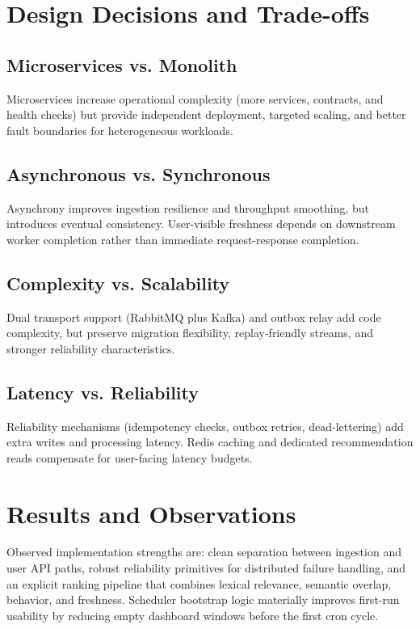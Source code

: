 \documentclass[conference]{IEEEtran}
\begin{document}
\section{Design Decisions and Trade-offs}
\subsection{Microservices vs. Monolith}
Microservices increase operational complexity (more services, contracts, and health checks) but provide independent deployment, targeted scaling, and better fault boundaries for heterogeneous workloads.

\subsection{Asynchronous vs. Synchronous}
Asynchrony improves ingestion resilience and throughput smoothing, but introduces eventual consistency. User-visible freshness depends on downstream worker completion rather than immediate request-response completion.

\subsection{Complexity vs. Scalability}
Dual transport support (RabbitMQ plus Kafka) and outbox relay add code complexity, but preserve migration flexibility, replay-friendly streams, and stronger reliability characteristics.

\subsection{Latency vs. Reliability}
Reliability mechanisms (idempotency checks, outbox retries, dead-lettering) add extra writes and processing latency. Redis caching and dedicated recommendation reads compensate for user-facing latency budgets.

\section{Results and Observations}
Observed implementation strengths are: clean separation between ingestion and user API paths, robust reliability primitives for distributed failure handling, and an explicit ranking pipeline that combines lexical relevance, semantic overlap, behavior, and freshness. Scheduler bootstrap logic materially improves first-run usability by reducing empty dashboard windows before the first cron cycle.
\end{document}

